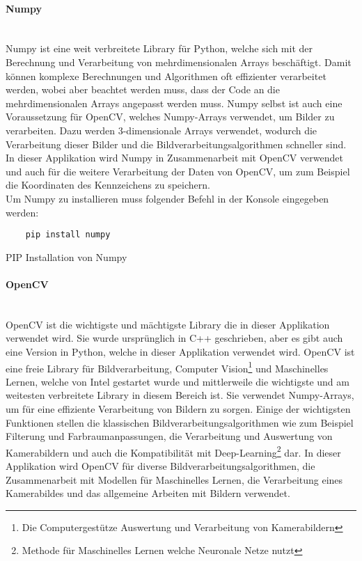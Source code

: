 \paragraph{Numpy}\mbox{}\\
Numpy ist eine weit verbreitete Library für Python, welche sich mit der Berechnung und Verarbeitung von mehrdimensionalen Arrays beschäftigt. 
Damit können komplexe Berechnungen und Algorithmen oft effizienter verarbeitet werden, wobei aber beachtet werden muss, dass der Code an die 
mehrdimensionalen Arrays angepasst werden muss. Numpy selbst ist auch eine Voraussetzung für OpenCV, welches Numpy-Arrays verwendet, um Bilder zu verarbeiten. 
Dazu werden 3-dimensionale Arrays verwendet, wodurch die Verarbeitung dieser Bilder und die Bildverarbeitungsalgorithmen schneller sind. In dieser 
Applikation wird Numpy in Zusammenarbeit mit OpenCV verwendet und auch für die weitere Verarbeitung der Daten von OpenCV, um zum Beispiel die 
Koordinaten des Kennzeichens zu speichern.\\

Um Numpy zu installieren muss folgender Befehl in der Konsole eingegeben werden:

\begin{listing}[H]
    \begin{verbatim}
    pip install numpy
    \end{verbatim}
    \caption{PIP Installation von Numpy}
\end{listing}

\paragraph{OpenCV}\mbox{}\\
OpenCV ist die wichtigste und mächtigste Library die in dieser Applikation verwendet wird. Sie wurde ursprünglich in C++ geschrieben, 
aber es gibt auch eine Version in Python, welche in dieser Applikation verwendet wird. OpenCV ist eine freie Library für Bildverarbeitung, 
Computer Vision\footnote{Die Computergestütze Auswertung und Verarbeitung von Kamerabildern} und Maschinelles Lernen, welche von Intel gestartet wurde und mittlerweile die wichtigste und am weitesten verbreitete 
Library in diesem Bereich ist. Sie verwendet Numpy-Arrays, um für eine effiziente Verarbeitung von Bildern zu sorgen. Einige der wichtigsten 
Funktionen stellen die klassischen Bildverarbeitungsalgorithmen wie zum Beispiel Filterung und Farbraumanpassungen, die Verarbeitung und 
Auswertung von Kamerabildern und auch die Kompatibilität mit Deep-Learning\footnote{Methode für Maschinelles Lernen welche Neuronale Netze nutzt} dar. In dieser Applikation wird OpenCV für diverse 
Bildverarbeitungsalgorithmen, die Zusammenarbeit mit Modellen für Maschinelles Lernen, die Verarbeitung eines Kamerabildes und das allgemeine Arbeiten mit Bildern verwendet.\\

